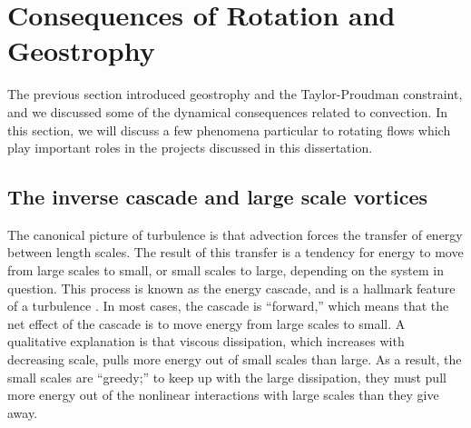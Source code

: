 \section{Consequences of Rotation and Geostrophy}
The previous section introduced geostrophy and the Taylor-Proudman constraint, and we discussed some of the dynamical consequences related to convection. 
In this section, we will discuss a few phenomena particular to rotating flows which play important roles in the projects discussed in this dissertation.
\subsection{The inverse cascade and large scale vortices}
The canonical picture of turbulence is that advection forces the transfer of energy between length scales. The result of this transfer is a tendency for energy to move from large scales to small, or small scales to large, depending on the system in question. 
This process is known as the energy cascade, and is a hallmark feature of a turbulence \citep{sP00}.
In most cases, the cascade is ``forward,'' which means that the net effect of the cascade is to move energy from large scales to small.
A qualitative explanation is that viscous dissipation, which increases with decreasing scale, pulls more energy out of small scales than large. As a result, the small scales are ``greedy;'' to keep up with the large dissipation, they must pull more energy out of the nonlinear interactions with large scales than they give away.

